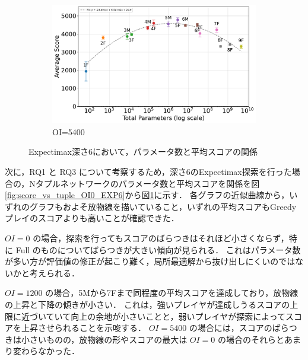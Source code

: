\begin{figure}[t]
    \vspace{1em}
    \begin{subfigure}[b]{\linewidth}
        \centering
        \includegraphics[width=\linewidth]{pdf/parameter_performance_plots/params_performance_OI5400_EXP6.pdf}
        \caption{OI=5400}
        \label{fig:score_vs_tuple_OI5400_EXP6}
    \end{subfigure}

    \caption{Expectimax深さ6において，パラメータ数と平均スコアの関係}
    \label{fig:score_vs_tuple_all_EXP6}
\end{figure}

次に，RQ1 と RQ3 について考察するため，深さ6のExpectimax探索を行った場合の，Nタプルネットワークのパラメータ数と平均スコアを関係を図\ref{fig:score_vs_tuple_OI0_EXP6}から図\ref{fig:score_vs_tuple_OI5400_EXP6}に示す．
各グラフの近似曲線から，いずれのグラフもおよそ放物線を描いていること，いずれの平均スコアもGreedyプレイのスコアよりも高いことが確認できた．

$\mathit{OI}=0$ の場合，探索を行ってもスコアのばらつきはそれほど小さくならず，特に Full のものについてばらつきが大きい傾向が見られる．
これはパラメータ数が多い方が評価値の修正が起こり難く，局所最適解から抜け出しにくいのではないかと考えられる．

$\mathit{OI}=1200$ の場合，\textsf{5M}から\textsf{7F}まで同程度の平均スコアを達成しており，放物線の上昇と下降の傾きが小さい．
これは，強いプレイヤが達成しうるスコアの上限に近づいていて向上の余地が小さいことと，弱いプレイヤが探索によってスコアを上昇させられることを示唆する．
$\mathit{OI}=5400$ の場合には，スコアのばらつきは小さいものの，放物線の形やスコアの最大は $\mathit{OI}=0$ の場合のそれらとあまり変わらなかった．


